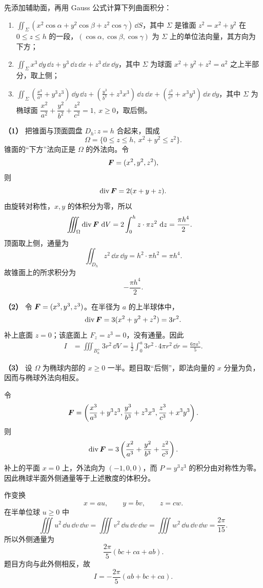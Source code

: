 \begin{xexercise}[2]
先添加辅助面，再用 Gauss 公式计算下列曲面积分：
\begin{enumerate}[label=(\arabic*)]
\item $\displaystyle\iint_\Sigma(x^2\cos\alpha+y^2\cos\beta+z^2\cos\gamma)\,\dd S$，其中 $\Sigma$ 是锥面 $z^2=x^2+y^2$ 在 $0\le z\le h$ 的一段，$(\cos\alpha,\cos\beta,\cos\gamma)$ 为 $\Sigma$ 上的单位法向量，其方向为下方；
\item $\displaystyle\iint_\Sigma x^3\,\dd y\,\dd z+y^3\,\dd z\,\dd x+z^3\,\dd x\,\dd y$，其中 $\Sigma$ 为球面 $x^2+y^2+z^2=a^2$ 之上半部分，取上侧；
\item $\displaystyle\iint_\Sigma\left(\frac{x^3}{a^3}+y^3z^3\right)\,\dd y\,\dd z+
\left(\frac{y^3}{b^3}+z^3x^3\right)\,\dd z\,\dd x+
\left(\frac{z^3}{c^3}+x^3y^3\right)\,\dd x\,\dd y$，其中 $\Sigma$ 为椭球面 $\dfrac{x^2}{a^2}+\dfrac{y^2}{b^2}+\dfrac{z^2}{c^2}=1,\ x\ge0$，取后侧。
\end{enumerate}
\end{xexercise}
\begin{xsolution}
\textbf{（1）}\quad
把锥面与顶面圆盘 $D_h:z=h$ 合起来，围成
\[
  \Omega=\{0\le z\le h,\ x^2+y^2\le z^2\}.
\]
锥面的“下方”法向正是 $\Omega$ 的外法向。令
\[
  \bm{F}=(x^2,y^2,z^2),
\]
则
\[
  \operatorname{div}\bm{F}=2(x+y+z).
\]
由旋转对称性，$x,y$ 的体积分为零，所以
\begin{align*}
\iiint_\Omega\operatorname{div}\bm{F}\,\mathop{}\!\mathrm{d} V
&=2\int_0^h z\cdot\pi z^2\,\mathop{}\!\mathrm{d} z
=\frac{\pi h^4}{2}.
\end{align*}
顶面取上侧，通量为
\[
  \iint_{D_h}z^2\,\dd x\,\dd y=h^2\cdot\pi h^2=\pi h^4.
\]
故锥面上的所求积分为
\[
  \boxed{-\frac{\pi h^4}{2}}.
\]

\textbf{（2）}\quad
令 $\bm{F}=(x^3,y^3,z^3)$。在半径为 $a$ 的上半球体中，
\[
  \operatorname{div}\bm{F}=3(x^2+y^2+z^2)=3r^2.
\]
补上底面 $z=0$；该底面上 $F_z=z^3=0$，没有通量。因此
\begin{align*}
I
&=\iiint_{B_a^+}3r^2\,\dd V
=\frac12\int_0^a3r^2\cdot4\pi r^2\,\dd r
=\frac{6\pi a^5}{5}.
\end{align*}

\textbf{（3）}\quad
设 $\Omega$ 为椭球内部的 $x\ge0$ 一半。题目取“后侧”，即法向量的 $x$ 分量为负，因而与椭球外法向相反。

令
\[
\bm{F}=\left(\frac{x^3}{a^3}+y^3z^3,
\frac{y^3}{b^3}+z^3x^3,
\frac{z^3}{c^3}+x^3y^3\right).
\]
则
\[
  \operatorname{div}\bm{F}
  =3\left(\frac{x^2}{a^3}+\frac{y^2}{b^3}+\frac{z^2}{c^3}\right).
\]
补上的平面 $x=0$ 上，外法向为 $(-1,0,0)$，而 $P=y^3z^3$ 的积分由对称性为零。因此椭球半面外侧通量等于上述散度的体积分。

作变换
\[
  x=au,\qquad y=bv,\qquad z=cw.
\]
在半单位球 $u\ge0$ 中
\[
  \iiint u^2\,\dd u\,\dd v\,\dd w
  =\iiint v^2\,\dd u\,\dd v\,\dd w
  =\iiint w^2\,\dd u\,\dd v\,\dd w
  =\frac{2\pi}{15}.
\]
所以外侧通量为
\[
  \frac{2\pi}{5}(bc+ca+ab).
\]
题目方向与此外侧相反，故
\[
  \boxed{I=-\frac{2\pi}{5}(ab+bc+ca)}.
\]
\end{xsolution}


